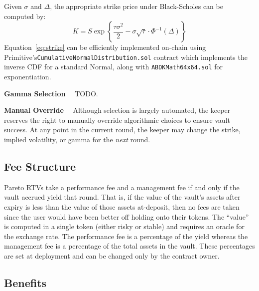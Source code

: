 \documentclass[hidelinks, 12pt]{article}
\begin{document}
Given $\sigma$ and $\Delta$, the appropriate strike price under Black-Scholes can be computed by: 
\begin{equation}
  K = S \exp \left\{ \frac{\tau \sigma^2}{2} - \sigma \sqrt{\tau} \cdot \Phi^{-1}(\Delta) \right\}
  \label{eq:strike}
\end{equation}
Equation~\ref{eq:strike} can be efficiently implemented on-chain using Primitive's\newline \texttt{CumulativeNormalDistribution.sol} contract which implements the inverse CDF for a standard Normal, along with \texttt{ABDKMath64x64.sol} for exponentiation.


\textbf{Gamma Selection}$\quad$ TODO.

\textbf{Manual Override}$\quad$ Although selection is largely automated, the keeper reserves the right to manually override algorithmic choices to ensure vault success. At any point in the current round, the keeper may change the strike, implied volatility, or gamma for the \textit{next} round.

\subsection{Fee Structure}
\label{sec:fees}

Pareto RTVs take a performance fee and a management fee if and only if the vault accrued yield that round.
That is, if the value of the vault's assets after expiry is less than the value of those assets at-deposit, then no fees are taken since the user would have been better off holding onto their tokens.
The ``value'' is computed in a single token (either risky or stable) and requires an oracle for the exchange rate.
The performance fee is a percentage of the yield whereas the management fee is a percentage of the total assets in the vault. These percentages are set at deployment and can be changed only by the contract owner.

\subsection{Benefits}
\end{document}
